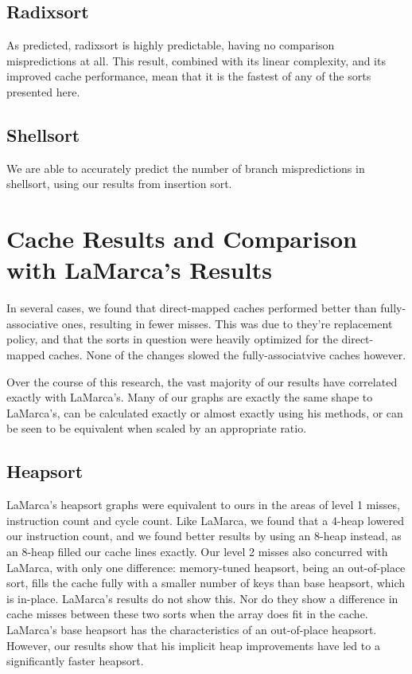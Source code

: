 \subsection{Radixsort}

As predicted, radixsort is highly predictable, having no comparison
mispredictions at all. This result, combined with its linear complexity, and its
improved cache performance, mean that it is the fastest of any of the sorts
presented here.


\subsection{Shellsort}

We are able to accurately predict the number of branch mispredictions in
shellsort, using our results from insertion sort. 

\section{Cache Results and Comparison with LaMarca's Results}

In several cases, we found that direct-mapped caches performed better than
fully-associative ones, resulting in fewer misses. This was due to they're
replacement policy, and that the sorts in question were heavily optimized for
the direct-mapped caches. None of the changes slowed the fully-associatvive
caches however.

Over the course of this research, the vast majority of our results have
correlated exactly with LaMarca's. Many of our graphs are exactly the same
shape to LaMarca's, can be calculated exactly or almost exactly using his
methods, or can be seen to be equivalent when scaled by an appropriate ratio.


\subsection{Heapsort}

LaMarca's heapsort graphs were equivalent to ours in the areas of level 1
misses, instruction count and cycle count. Like LaMarca, we found that a 4-heap
lowered our instruction count, and we found better results by using an 8-heap
instead, as an 8-heap filled our cache lines exactly. Our level 2 misses also
concurred with LaMarca, with only one difference: memory-tuned heapsort, being
an out-of-place sort, fills the cache fully with a smaller number of keys than
base heapsort, which is in-place. LaMarca's results do not show this. Nor do
they show a difference in cache misses between these two sorts when the array
does fit in the cache. LaMarca's base heapsort has the characteristics of an
out-of-place heapsort. However, our results show that his implicit heap
improvements have led to a significantly faster heapsort.


